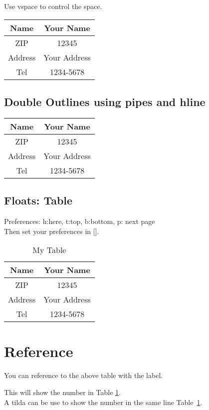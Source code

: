 \documentclass{article}
\begin{document}
\noindent
Use vspace to control the space.

\vspace{0.5cm}

\begin{tabular}{|c|c|}
	\hline
	Name    & Your Name    \\
	\hline
	ZIP     & 12345        \\
	\hline
	Address & Your Address \\
	\hline
	Tel     & 1234-5678    \\
	\hline
\end{tabular}

\subsection{Double Outlines using pipes and hline}
\begin{tabular}{||c||c||}
	\hline \hline
	Name    & Your Name    \\
	\hline \hline
	ZIP     & 12345        \\
	\hline \hline
	Address & Your Address \\
	\hline \hline
	Tel     & 1234-5678    \\
	\hline \hline
\end{tabular}
\newpage
\subsection{Floats: Table}
Preferences: h:here, t:top, b:bottom, p: next page
\\
Then set your preferences in [].

\begin{table}[hbtp]
	\caption{My Table}
	\begin{center}
		\begin{tabular}{|c||c|}
			\hline
			Name    & Your Name    \\
			\hline
			ZIP     & 12345        \\
			\hline
			Address & Your Address \\
			\hline
			Tel     & 1234-5678    \\
			\hline
		\end{tabular}
	\end{center}
	\label{tab:my-table}
\end{table}

\section{Reference}

You can reference to the above table with the label.

\noindent
This will show the number in Table \ref{tab:my-table}.
\\

\noindent
A tilda can be use to show the number in the same line Table~\ref{tab:my-table}.
\end{document}
